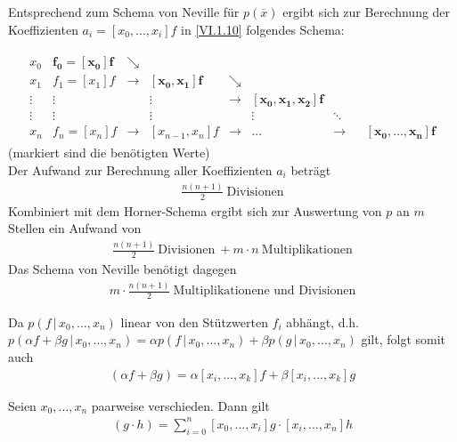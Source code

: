 Entsprechend zum Schema von Neville für $p(\overline{x})$
ergibt sich zur Berechnung der Koeffizienten $a_i=[x_0,\dots,x_i]f$
in \eqref{VI.1.10} folgendes Schema:

\begin{gather*}
  \begin{array}{ccccccccc}
    x_0 & \boldsymbol{f_0=[x_0]f} & \searrow\\
    x_1 & f_1=[x_1]f& \rightarrow &\boldsymbol{ [x_0,x_1]f}&\searrow \\
    \vdots&\vdots &&\vdots &\rightarrow & \boldsymbol{[x_0,x_1,x_2]f}\\
    \vdots&\vdots &&\vdots &&\vdots&\ddots\\
    x_n& f_n=[x_n]f &\rightarrow&[x_{n-1},x_n]f&\rightarrow &
                                                              \dots &\rightarrow && \boldsymbol{[x_0,\dots,x_n]f}
  \end{array}
\end{gather*}
(markiert sind die benötigten Werte)\\
Der Aufwand zur Berechnung aller Koeffizienten $a_i$ beträgt
\begin{gather*}
  \frac{n(n+1)}{2} ~\text{Divisionen}
\end{gather*}
Kombiniert mit dem Horner-Schema ergibt sich
zur Auswertung von $p$ an $m$ Stellen ein Aufwand von
\begin{gather*}
  \frac{n(n+1)}{2} ~\text{Divisionen}
  ~+m\cdot n   ~\text{Multiplikationen}
\end{gather*}
Das Schema von Neville benötigt dagegen
\begin{gather*}
  m\cdot\frac{n(n+1)}{2} ~\text{Multiplikationene und Divisionen}
\end{gather*}

\begin{Beme}
  Da $p(f\,|\, x_0,\dots, x_n)$ linear von den Stützwerten $f_i$
  abhängt,
  d.h. $p(\alpha f+\beta g\,|\, x_0,\dots, x_n)= 
  \alpha p(f\,|\, x_0,\dots, x_n)+\beta p(g\,|\, x_0,\dots, x_n)$
  gilt, folgt somit auch
  \begin{gather*}
    [x_i,\dots, x_k](\alpha f+\beta g)
    =  \alpha [x_i,\dots, x_k]f+\beta [x_i,\dots, x_k]g 
  \end{gather*}
\end{Beme}


\begin{Satze}\label{6.1.10}
  Seien $x_0,\dots, x_n$ paarweise verschieden. Dann gilt
  \begin{gather}
    [x_0,\dots, x_n] (g\cdot h) = \sum_{i=0}^{n}[x_0,\dots,x_i]g\cdot [x_i,\dots,x_n]h
    \label{VI.1.14}
  \end{gather}
\end{Satze}


